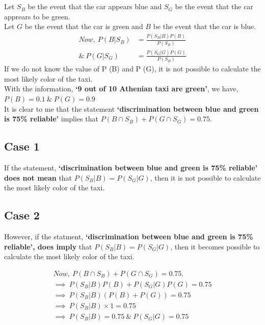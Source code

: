 \documentclass[a4paper,fleqn,11pt]{article}
\theoremstyle{mytheor}
\begin{document}
\section{}

Let $S_B$ be the event that the car appears blue and $S_G$ be the event that the car apprears to be green. \\
Let $G$ be the event that the car is green and $B$ be the event that the car is blue.
\begin{align*}
Now,\ P (B | S_B) & = \frac{P (S_B | B) P (B)}{P (S_B)} \\
\&\ P (G | S_G) & = \frac{P (S_G | G) P (G)}{P (S_B)}
\end{align*}
If we do not know the value of P (B) and P (G), it is not possible to calculate the most likely color of the taxi. \\

With the information, \textbf{`9 out of 10 Athenian taxi are green'}, we have, \\
$P (B) = 0.1\ \&\ P (G) = 0.9$ \\

It is clear to me that the statement \textbf{`discrimination between blue and green is 75\% reliable'} implies that $P (B \cap S_B) + P (G \cap S_G) = 0.75$.

\subsection*{Case 1}
If the statement, \textbf{`discrimination between blue and green is 75\% reliable'} \textbf{does not mean} that $P(S_B | B) = P (S_G | G)$, then it is not possible to calculate the most likely color of the taxi.

\subsection*{Case 2}
However, if the statment, \textbf{`discrimination between blue and green is 75\% reliable', does imply} that $P(S_B | B) = P (S_G | G)$, then it becomes possible to calculate the most likely color of the taxi.

\begin{align*}
Now,\ P (B \cap S_B) + P (G \cap S_G) = 0.75. \\
\implies\ P (S_B | B) P (B) + P (S_G | G) P (G) = 0.75 \\
\implies\ P (S_B | B) (P (B) + P (G)) = 0.75 \\
\implies\ P (S_B | B) \times 1 = 0.75 \\
\implies\ P (S_B | B)  = 0.75\ \&\ P (S_G | G) = 0.75
\end{align*}
\end{document}
